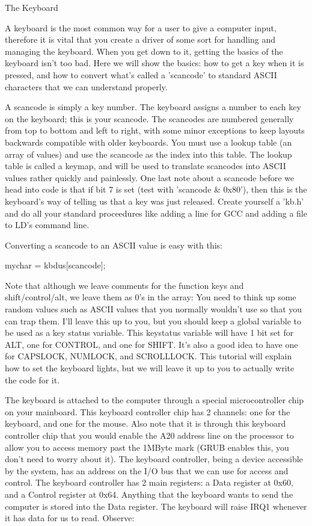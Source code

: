 \documentclass[11pt]{article}
\begin{document}
The Keyboard

A keyboard is the most common way for a user to give a computer input, therefore it is vital that you create a driver of some sort for handling and managing the keyboard. When you get down to it, getting the basics of the keyboard isn't too bad. Here we will show the basics: how to get a key when it is pressed, and how to convert what's called a 'scancode' to standard ASCII characters that we can understand properly.

A scancode is simply a key number. The keyboard assigns a number to each key on the keyboard; this is your scancode. The scancodes are numbered generally from top to bottom and left to right, with some minor exceptions to keep layouts backwards compatible with older keyboards. You must use a lookup table (an array of values) and use the scancode as the index into this table. The lookup table is called a keymap, and will be used to translate scancodes into ASCII values rather quickly and painlessly. One last note about a scancode before we head into code is that if bit 7 is set (test with 'scancode \& 0x80'), then this is the keyboard's way of telling us that a key was just released. Create yourself a 'kb.h' and do all your standard proceedures like adding a line for GCC and adding a file to LD's command line.

Converting a scancode to an ASCII value is easy with this:

mychar = kbdus[scancode];

Note that although we leave comments for the function keys and shift/control/alt, we leave them as 0's in the array: You need to think up some random values such as ASCII values that you normally wouldn't use so that you can trap them. I'll leave this up to you, but you should keep a global variable to be used as a key status variable. This keystatus variable will have 1 bit set for ALT, one for CONTROL, and one for SHIFT. It's also a good idea to have one for CAPSLOCK, NUMLOCK, and SCROLLLOCK. This tutorial will explain how to set the keyboard lights, but we will leave it up to you to actually write the code for it.

The keyboard is attached to the computer through a special microcontroller chip on your mainboard. This keyboard controller chip has 2 channels: one for the keyboard, and one for the mouse. Also note that it is through this keyboard controller chip that you would enable the A20 address line on the processor to allow you to access memory past the 1MByte mark (GRUB enables this, you don't need to worry about it). The keyboard controller, being a device accessible by the system, has an address on the I/O bus that we can use for access and control. The keyboard controller has 2 main registers: a Data register at 0x60, and a Control register at 0x64. Anything that the keyboard wants to send the computer is stored into the Data register. The keyboard will raise IRQ1 whenever it has data for us to read. Observe:
\end{document}
